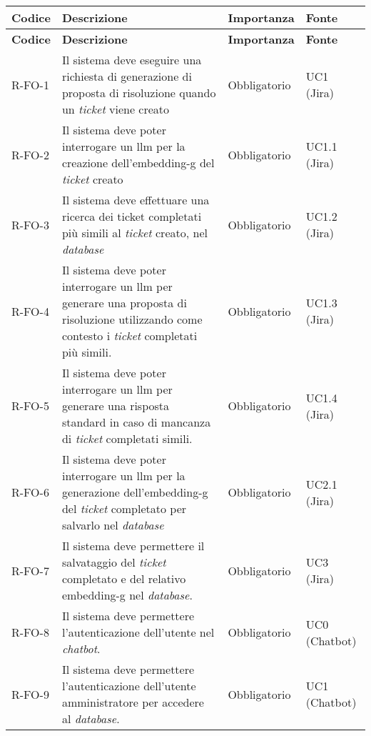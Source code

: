 \renewcommand{\arraystretch}{1.4}
\begin{longtable}{|p{1.5cm}|p{5.5cm}|p{2cm}|p{2.5cm}|} 
    \hline
    \rowcolor{tableheader}\textbf{Codice} & \textbf{Descrizione} & \textbf{Importanza} & \textbf{Fonte}\\
    \hline
    \endfirsthead

    \rowcolor{tableheader}\textbf{Codice} & \textbf{Descrizione} & \textbf{Importanza} & \textbf{Fonte} \\
    \hline
    \endhead

    \hline
    \endfoot

    \hline
    \endlastfoot
    \hline
    R-FO-1 & Il sistema deve eseguire una richiesta di generazione di proposta di risoluzione quando un \textit{ticket} viene creato & Obbligatorio & UC1 (Jira) \\
    \hline
    R-FO-2 & Il sistema deve poter interrogare un \gls{llm} per la creazione dell'\gls{embedding-g} del \textit{ticket} creato & Obbligatorio & UC1.1 (Jira) \\
    \hline
    R-FO-3 & Il sistema deve effettuare una ricerca dei ticket completati più simili al \textit{ticket} creato, nel \textit{database} & Obbligatorio & UC1.2 (Jira) \\
    \hline
    R-FO-4 & Il sistema deve poter interrogare un \gls{llm} per generare una proposta di risoluzione utilizzando come contesto i \textit{ticket} completati più simili. & Obbligatorio & UC1.3 (Jira) \\
    \hline
    R-FO-5 & Il sistema deve poter interrogare un \gls{llm} per generare una risposta standard in caso di mancanza di \textit{ticket} completati simili. & Obbligatorio & UC1.4 (Jira) \\
    \hline
    R-FO-6 & Il sistema deve poter interrogare un \gls{llm} per la generazione dell'\gls{embedding-g} del \textit{ticket} completato per salvarlo nel \textit{database} & Obbligatorio & UC2.1 (Jira) \\
    \hline
    R-FO-7 & Il sistema deve permettere il salvataggio del \textit{ticket} completato e del relativo \gls{embedding-g} nel \textit{database}. & Obbligatorio & UC3 (Jira) \\
    \hline
    R-FO-8 & Il sistema deve permettere l'autenticazione dell'utente nel \textit{chatbot}. & Obbligatorio & UC0 (Chatbot) \\
    \hline
    R-FO-9 & Il sistema deve permettere l'autenticazione dell'utente amministratore per accedere al \textit{database}. & Obbligatorio & UC1 (Chatbot) \\

\end{longtable}
